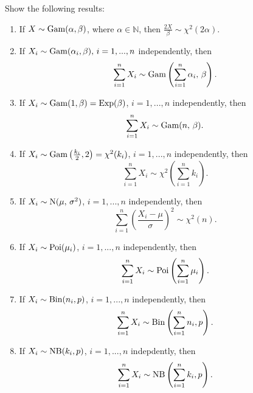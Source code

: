 \documentclass[notoc,notitlepage]{tufte-book}
\begin{document}
\begin{ex}
  Show the following results:
  \begin{enumerate}
    \item If $X \sim \operatorname{Gam}(\alpha, \beta)$, where $\alpha \in \mathbb{N}$, then $\frac{2X}{\beta} \sim \chi^2 (2 \alpha)$.
    \item If $X_i \sim \operatorname{Gam}(\alpha_i, \beta), \, i = 1, ..., n$ independently, then
      \begin{equation*}
        \sum_{i=1}^{n} X_i \sim \operatorname{Gam}\left( \sum_{i=1}^{n} \alpha_i, \, \beta \right).
      \end{equation*}
    \item If $X_i \sim \operatorname{Gam}(1, \beta) = \operatorname{Exp}(\beta)$, $i = 1, ..., n$ independently, then
      \begin{equation*}
        \sum_{i=1}^{n} X_i  \sim \operatorname{Gam}(n, \, \beta).
      \end{equation*}
    \item If $X_i \sim \operatorname{Gam}\left( \frac{k_i}{2}, 2 \right) = \chi^2 ( k_i )$, $i = 1, ..., n$ independently, then
      \begin{equation*}
        \sum_{i=1}^{n} X_i \sim \chi^2 \left( \sum_{i=1}^{n} k_i \right).
      \end{equation*}
    \item If $X_i \sim \operatorname{N}( \mu, \, \sigma^2 )$, $i = 1, ..., n$ independently, then
      \begin{equation*}
        \sum_{i=1}^{n} \left( \frac{X_i - \mu}{\sigma} \right)^2 \sim \chi^2(n).
      \end{equation*}
    \item If $X_i \sim \operatorname{Poi}(\mu_i)$, $i = 1, ..., n$ independently, then
      \begin{equation*}
        \sum_{i=1}^{n} X_i \sim \operatorname{Poi}\left( \sum_{i=1}^{n} \mu_i \right).
      \end{equation*}
    \item If $X_i \sim \operatorname{Bin}(n_i, p)$, $i = 1, ..., n$ independently, then
      \begin{equation*}
        \sum_{i=1}^{n} X_i \sim \operatorname{Bin}\left( \sum_{i=1}^{n} n_i, p \right).
      \end{equation*}
    \item If $X_i \sim \operatorname{NB}(k_i, p)$, $i = 1, ..., n$ indepdently, then
      \begin{equation*}
        \sum_{i=1}^{n} X_i \sim \operatorname{NB}\left( \sum_{i=1}^{n} k_i, p \right).
      \end{equation*}
  \end{enumerate}
\end{ex}
\end{document}

